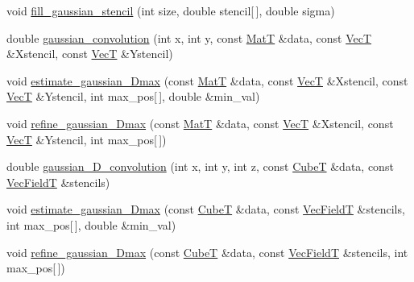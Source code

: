 \begin{DoxyCompactItemize}
void \hyperlink{namespacemappel_a09a770c2a4eaa7c083abbac26ec70ff3}{fill\+\_\+gaussian\+\_\+stencil} (int size, double stencil\mbox{[}$\,$\mbox{]}, double sigma)
\item 
double \hyperlink{namespacemappel_a93917141391e8f1ac5b4b5b0712cd29c}{gaussian\+\_\+convolution} (int x, int y, const \hyperlink{namespacemappel_a7091ab87c528041f7e2027195fad8915}{MatT} \&data, const \hyperlink{namespacemappel_a2225ad69f358daa3f4f99282a35b9a3a}{VecT} \&Xstencil, const \hyperlink{namespacemappel_a2225ad69f358daa3f4f99282a35b9a3a}{VecT} \&Ystencil)
\item 
void \hyperlink{namespacemappel_a3b80821e227772c7480e6d5d27090593}{estimate\+\_\+gaussian\+\_\+Dmax} (const \hyperlink{namespacemappel_a7091ab87c528041f7e2027195fad8915}{MatT} \&data, const \hyperlink{namespacemappel_a2225ad69f358daa3f4f99282a35b9a3a}{VecT} \&Xstencil, const \hyperlink{namespacemappel_a2225ad69f358daa3f4f99282a35b9a3a}{VecT} \&Ystencil, int max\+\_\+pos\mbox{[}$\,$\mbox{]}, double \&min\+\_\+val)
\item 
void \hyperlink{namespacemappel_ae0365a07ea08b7deae147915077091c8}{refine\+\_\+gaussian\+\_\+Dmax} (const \hyperlink{namespacemappel_a7091ab87c528041f7e2027195fad8915}{MatT} \&data, const \hyperlink{namespacemappel_a2225ad69f358daa3f4f99282a35b9a3a}{VecT} \&Xstencil, const \hyperlink{namespacemappel_a2225ad69f358daa3f4f99282a35b9a3a}{VecT} \&Ystencil, int max\+\_\+pos\mbox{[}$\,$\mbox{]})
\item 
double \hyperlink{namespacemappel_af7eb6e00596bd775bfefa5b8d826241d}{gaussian\+\_\+D\+\_\+convolution} (int x, int y, int z, const \hyperlink{namespacemappel_ab2afab4e6c8805e83946670d882768c2}{CubeT} \&data, const \hyperlink{namespacemappel_a834ec4f32487f07c0ca1e22d4928d1f8}{Vec\+FieldT} \&stencils)
\item 
void \hyperlink{namespacemappel_a2d597c426bd6287ad1a506511a68c9c2}{estimate\+\_\+gaussian\+\_\+Dmax} (const \hyperlink{namespacemappel_ab2afab4e6c8805e83946670d882768c2}{CubeT} \&data, const \hyperlink{namespacemappel_a834ec4f32487f07c0ca1e22d4928d1f8}{Vec\+FieldT} \&stencils, int max\+\_\+pos\mbox{[}$\,$\mbox{]}, double \&min\+\_\+val)
\item 
void \hyperlink{namespacemappel_ab65cc5c100590b4b5246984162e3e678}{refine\+\_\+gaussian\+\_\+Dmax} (const \hyperlink{namespacemappel_ab2afab4e6c8805e83946670d882768c2}{CubeT} \&data, const \hyperlink{namespacemappel_a834ec4f32487f07c0ca1e22d4928d1f8}{Vec\+FieldT} \&stencils, int max\+\_\+pos\mbox{[}$\,$\mbox{]})
\item 

\end{DoxyCompactItemize}
